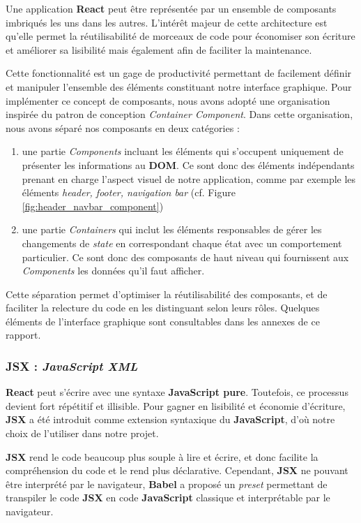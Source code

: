 \documentclass[a4paper,12pt]{report}
\theoremstyle{break}
\theoremstyle{break}
\theoremstyle{break}
\theoremstyle{break}
\theoremstyle{definition}
\theoremstyle{remark}
\begin{document}
Une application \textbf{React} peut être représentée par un ensemble de composants imbriqués les uns dans les autres. L’intérêt majeur de cette architecture est qu’elle permet la réutilisabilité de \og morceaux de code \fg pour économiser son écriture et améliorer sa lisibilité mais également afin de faciliter la maintenance.

Cette fonctionnalité est un gage de productivité permettant de facilement définir et manipuler l’ensemble des éléments constituant notre interface graphique.
Pour implémenter ce concept de composants, nous avons adopté une organisation inspirée du patron de conception \textit{Container Component}. Dans cette organisation, nous avons séparé nos composants en deux catégories :

\begin{enumerate}
  \item une partie \textit{Components} incluant les éléments qui s’occupent uniquement de présenter les informations au \textbf{DOM}. Ce sont donc des éléments indépendants prenant en charge l’aspect visuel de notre application, comme par exemple les éléments \textit{header, footer, navigation bar} (cf. Figure \ref{fig:header_navbar_component})
  \item une partie \textit{Containers} qui inclut les éléments responsables de gérer les changements de \textit{state} en correspondant chaque état avec un comportement particulier. Ce sont donc des composants de haut niveau qui fournissent aux \textit{Components} les données qu’il faut afficher.
\end{enumerate}

Cette séparation permet d'optimiser la réutilisabilité des composants, et de faciliter la relecture du code en les distinguant selon leurs rôles. Quelques éléments de l'interface graphique sont consultables dans les annexes de ce rapport.

\subsubsection{JSX : \textit{JavaScript XML}}
\textbf{React} peut s’écrire avec une syntaxe \textbf{JavaScript pure}. Toutefois, ce processus devient fort répétitif et illisible. Pour gagner en lisibilité et économie d'écriture, \textbf{JSX} a été introduit comme extension syntaxique du \textbf{JavaScript}, d'où notre choix de l'utiliser dans notre projet.

\textbf{JSX} rend le code beaucoup plus souple à lire et écrire, et donc facilite la compréhension du code et le rend plus déclarative. Cependant, \textbf{JSX} ne pouvant être interprété par le navigateur, \textbf{Babel} a proposé un \textit{preset} permettant de transpiler le code \textbf{JSX} en code \textbf{JavaScript} classique et interprétable par le navigateur.
\end{document}
